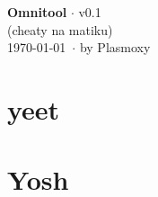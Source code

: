 \documentclass[10pt,a4paper]{article}
\begin{document}
	\begin{center}
		\Large{\textbf{Omnitool} $\cdot$ v0.1}\\
		(cheaty na matiku)\\
		\today\ $\cdot$ by Plasmoxy
	\end{center}

	\section{yeet}
	\blindtext[1]

	\section{Yosh}
	\blindtext[2]
\end{document}
